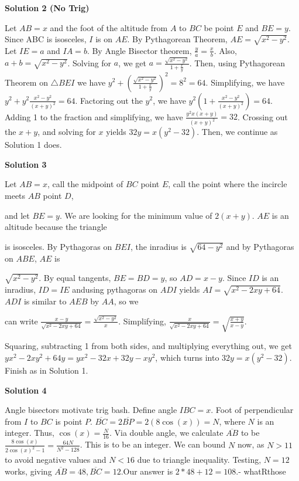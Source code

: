 \begin{enumerate}
\textbf{Solution 2 (No Trig)}

Let $AB=x$ and the foot of the altitude from $A$ to $BC$ be point $E$ and $BE=y$. Since ABC is isosceles, $I$ is on $AE$. By Pythagorean Theorem, $AE=\sqrt{x^2-y^2}$. Let $IE=a$ and $IA=b$. By Angle Bisector theorem, $\frac{y}{a}=\frac{x}{b}$. Also, $a+b=\sqrt{x^2-y^2}$. Solving for $a$, we get $a=\frac{\sqrt{x^2-y^2}}{1+\frac{x}{y}}$. Then, using Pythagorean Theorem on $\triangle BEI$ we have $y^2+\left(\frac{\sqrt{x^2-y^2}}{1+\frac{x}{y}}\right)^2=8^2=64$. Simplifying, we have $y^2+y^2\frac{x^2-y^2}{(x+y)^2}=64$. Factoring out the $y^2$, we have $y^2\left(1+\frac{x^2-y^2}{(x+y)^2}\right)=64$. Adding 1 to the fraction and simplifying, we have $\frac{y^2x(x+y)}{(x+y)^2}=32$. Crossing out the $x+y$, and solving for $x$ yields $32y = x(y^2-32)$. Then, we continue as Solution 1 does.

 



\textbf{Solution 3}

Let $AB=x$, call the midpoint of $BC$ point $E$, call the point where the incircle meets $AB$ point $D$, 

 and let $BE=y$. We are looking for the minimum value of $2(x+y)$. $AE$ is an altitude because the triangle

 is isosceles. By Pythagoras on $BEI$, the inradius is $\sqrt{64-y^2}$ and by Pythagoras on $ABE$, $AE$ is

 $\sqrt{x^2-y^2}$. By equal tangents, $BE=BD=y$, so $AD=x-y$. Since $ID$ is an inradius, $ID=IE$ andusing pythagoras on $ADI$ yields $AI=$$\sqrt{x^2-2xy+64}$. $ADI$ is similar to $AEB$ by $AA$, so we 

 can write $\frac{x-y}{\sqrt{x^2-2xy+64}}=\frac{\sqrt{x^2-y^2}}{x}$. Simplifying, $\frac{x}{\sqrt{x^2-2xy+64}}=\sqrt{\frac{x+y}{x-y}}$. 

 Squaring, subtracting 1 from both sides, and multiplying everything out, we get $yx^2-2xy^2+64y=yx^2 -32x+32y-xy^2$, which turns into $32y=x(y^2-32)$. Finish as in Solution 1.

 



\textbf{Solution 4}

Angle bisectors motivate trig bash. Define angle $IBC = x$. Foot of perpendicular from $I$ to $BC$ is point $P$. $\overline{BC} = 2\overline{BP} = 2(8\cos(x)) = N$, where $N$ is an integer. Thus, $\cos(x) = \frac{N}{16}$. Via double angle, we calculate $\overline{AB}$ to be $\frac{8\cos(x)}{2\cos(x)^2 - 1} = \frac{64N}{N^2 - 128}$. This is to be an integer.  We can bound $N$ now, as $N > 11$ to avoid negative values and $N < 16$ due to triangle inequality. Testing, $N = 12$ works, giving $\overline{AB} = 48, \overline{BC} = 12$.Our answer is $2 * 48 + 12 = \boxed{108}$.- whatRthose


\end{enumerate}
